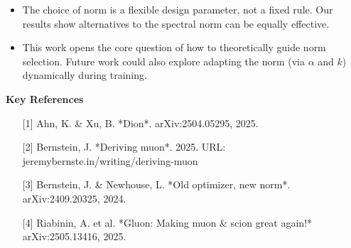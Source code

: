 \documentclass[fontsize=10pt]{beamer}
\begin{document}
\begin{frame}[fragile]
\begin{columns}[T]
\begin{column}{0.30\textwidth}
\begin{itemize}
    \item The choice of norm is a flexible design parameter, not a fixed rule. Our results show alternatives to the spectral norm can be equally effective.

    \item This work opens the core question of how to theoretically guide norm selection. Future work could also explore adapting the norm (via $\alpha$ and $k$) dynamically during training.
\end{itemize}

\vspace{0.5em}
\textbf{\Huge\color{Zen}Key References}\\[0.6em]

\begin{itemize}
   \large
    \setlength{\itemsep}{0pt} %
    \item[{[1]}] Ahn, K. \& Xu, B. *Dion*. arXiv:2504.05295, 2025.
    \item[{[2]}] Bernstein, J. *Deriving muon*. 2025. URL: jeremybernste.in/writing/deriving-muon
    \item[{[3]}] Bernstein, J. \& Newhouse, L. *Old optimizer, new norm*. arXiv:2409.20325, 2024.
    \item[{[4]}] Riabinin, A. et al. *Gluon: Making muon \& scion great again!* arXiv:2505.13416, 2025.
\end{itemize}

\end{column}
\hspace*{0.02\textwidth}%
\end{columns}

\end{frame}
\end{document}
